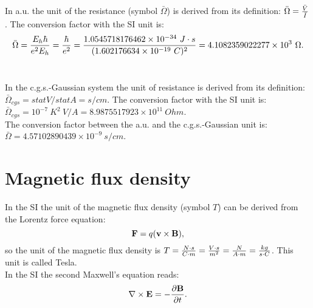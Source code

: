 \documentclass[12pt,a4paper]{article}
\def\hbarf{1.0545718176462\times 10^{-34}}
\def\barc{1.602176634\times 10^{-19}}
\def\barohm{4.1082359022277\times 10^{3}}
\def\ohmtoohm{8.9875517923\times 10^{11}}
\def\barohmcgs{4.57102890439\times 10^{-9}}
\begin{document}
{\color{web-blue} In a.u. the unit of the resistance (symbol $\bar \Omega$) 
is derived from its definition: $\bar \Omega={\bar V \over \bar I}$. The
conversion factor with the SI unit is:
\begin{equation}
\bar \Omega = {E_h \hbar \over e^2 E_h}=  
{\hbar \over e^2}=
{\hbarf\ J\cdot s\over (\barc\ C)^2}=\barohm\ \Omega.
\end{equation}
\\
}

{\color{orange} In the c.g.s.-Gaussian system the unit of resistance
is derived from its definition:
$\bar \Omega_{cgs}=statV/statA=s/cm$. The conversion factor with the SI 
unit is:
$\bar \Omega_{cgs}=10^{-7}\ K^2\ V/A=\ohmtoohm\ Ohm$.
}
\\

{\color{green}
The conversion factor between the a.u. and the c.g.s.-Gaussian unit
is: $\bar \Omega = \barohmcgs \ s/cm$.
}


\newpage
\section{\color{coral}Magnetic flux density}
In the SI the unit of the magnetic flux density 
(symbol $T$) can be derived from the Lorentz force equation:
\begin{equation}
{\bf F}=q ({\bf v} \times {\bf B}),
\label{lforce}
\end{equation}
so the unit of the magnetic flux density is $T={N\cdot s\over C\cdot m} = 
{V \cdot s \over m^2}={N \over A\cdot m}={kg \over s \cdot C}$. 
This unit is called Tesla. \\
In the SI the second Maxwell's equation reads:
\begin{equation}
\nabla \times {\bf E}=-{\partial {\bf B} \over \partial t}.
\end{equation}
\\
\end{document}
